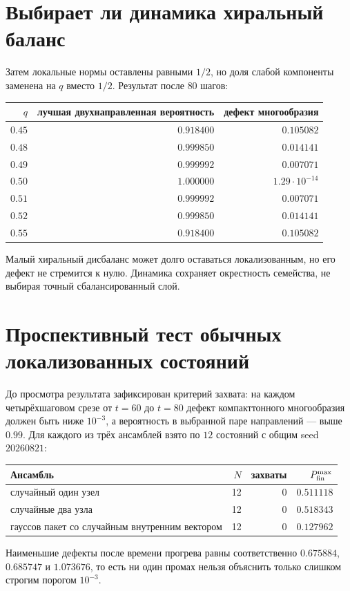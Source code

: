 \section{Выбирает ли динамика хиральный баланс}

Затем локальные нормы оставлены равными $1/2$, но доля слабой компоненты
заменена на $q$ вместо $1/2$. Результат после $80$ шагов:
\begin{center}
\begin{tabular}{@{}rrr@{}}
\toprule
$q$ & лучшая двухнаправленная вероятность & дефект многообразия \\
\midrule
$0.45$ & $0.918400$ & $0.105082$ \\
$0.48$ & $0.999850$ & $0.014141$ \\
$0.49$ & $0.999992$ & $0.007071$ \\
$0.50$ & $1.000000$ & $1.29\cdot10^{-14}$ \\
$0.51$ & $0.999992$ & $0.007071$ \\
$0.52$ & $0.999850$ & $0.014141$ \\
$0.55$ & $0.918400$ & $0.105082$ \\
\bottomrule
\end{tabular}
\end{center}
Малый хиральный дисбаланс может долго оставаться локализованным, но его
дефект не стремится к нулю. Динамика сохраняет окрестность семейства, не
выбирая точный сбалансированный слой.

\section{Проспективный тест обычных локализованных состояний}

До просмотра результата зафиксирован критерий захвата: на каждом
четырёхшаговом срезе от $t=60$ до $t=80$ дефект компакттонного
многообразия должен быть ниже $10^{-3}$, а вероятность в выбранной паре
направлений --- выше $0.99$. Для каждого из трёх ансамблей взято по
$12$ состояний с общим seed $20260821$:
\begin{center}
\begin{tabular}{@{}p{6.2cm}rrr@{}}
\toprule
Ансамбль & $N$ & захваты & $P_{\rm fin}^{\max}$ \\
\midrule
случайный один узел & 12 & 0 & $0.511118$ \\
случайные два узла & 12 & 0 & $0.518343$ \\
гауссов пакет со случайным внутренним вектором & 12 & 0 & $0.127962$ \\
\bottomrule
\end{tabular}
\end{center}
Наименьшие дефекты после времени прогрева равны соответственно
$0.675884$, $0.685747$ и $1.073676$, то есть ни один промах нельзя
объяснить только слишком строгим порогом $10^{-3}$.

